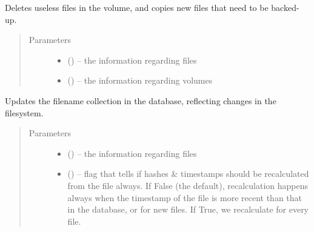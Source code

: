 \documentclass[letterpaper,10pt,english]{sphinxmanual}
\begin{document}

\begin{fulllineitems}
\label{\detokenize{index:fsbackup.commands.updateVolume}}
Deletes useless files in the volume, and copies new files that need to be backed-up.
\begin{quote}\begin{description}
\item[{Parameters}] \leavevmode\begin{itemize}
\item {} 
 ({\hyperref[\detokenize{index:fsbackup.fileDB.FileDB}]{}}) -- the information regarding files

\item {} 
 ({\hyperref[\detokenize{index:fsbackup.hashVolume.HashVolume}]{}}) -- the information regarding volumes

\end{itemize}

\end{description}\end{quote}

\end{fulllineitems}


\begin{fulllineitems}
\label{\detokenize{index:fsbackup.commands.refreshFileInfo}}
Updates the filename collection in the database, reflecting changes in the filesystem.
\begin{quote}\begin{description}
\item[{Parameters}] \leavevmode\begin{itemize}
\item {} 
 ({\hyperref[\detokenize{index:fsbackup.fileDB.FileDB}]{}}) -- the information regarding files

\item {} 
 () -- flag that tells if hashes \& timestamps should be recalculated from the file always.
If False (the default), recalculation happens always when the timestamp of the file is more recent than that
in the database, or for new files. If True, we recalculate for every file.

\end{itemize}

\end{description}\end{quote}

\end{fulllineitems}
\end{document}
